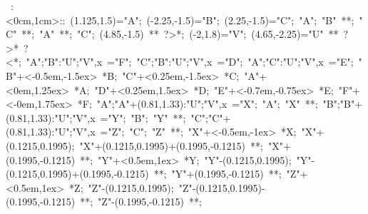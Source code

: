 
%

\hbox{
\xy    <1cm,0cm>:<0cm,1cm>::
       (1.125,1.5)="A"; (-2.25,-1.5)="B"; (2.25,-1.5)="C"; 
       "A"; "B" **\dir{-}; "C" **\dir{-}; "A" **\dir{-};
	 "C"; (4.85,-1.5) **\dir{--} ?>*\dir{>};
	 (-2,1.8)="V"; (4.65,-2.25)="U" **\dir{-} ?>*\dir{>} ?<*\dir{<}; 
       {"A";"B":"U";"V",x} ="F";   {"C";"B":"U";"V",x} ="D";   {"A";"C":"U";"V",x} ="E";
       "B"+<-0.5em,-1.5ex> *{B}; 
       "C"+<0.25em,-1.5ex> *{C}; 
       "A"+<0em,1.25ex> *{A}; 
       "D"+<0.25em,1.5ex> *{D}; 
       "E"+<-0.7em,-0.75ex> *{E};  
       "F"+<-0em,1.75ex> *{F};  
       {"A";"A"+(0.81,1.33):"U";"V",x} ="X"; "A"; "X" **;  
       {"B";"B"+(0.81,1.33):"U";"V",x} ="Y"; "B"; "Y" **;  
       {"C";"C"+(0.81,1.33):"U";"V",x} ="Z"; "C"; "Z" **;  
       "X"+<-0.5em,-1ex> *{X};  
           "X"+(0.1215,0.1995); "X"+(0.1215,0.1995)+(0.1995,-0.1215) **;
           "X"+(0.1995,-0.1215) **;
       "Y"+<0.5em,1ex> *{Y};  
           "Y"-(0.1215,0.1995); "Y"-(0.1215,0.1995)+(0.1995,-0.1215) **;
           "Y"+(0.1995,-0.1215) **;
       "Z"+<0.5em,1ex> *{Z};  
           "Z"-(0.1215,0.1995); "Z"-(0.1215,0.1995)-(0.1995,-0.1215) **;
           "Z"-(0.1995,-0.1215) **;
\endxy}


